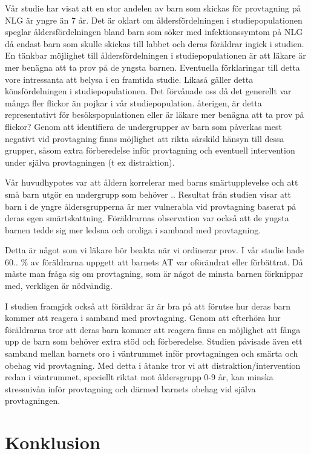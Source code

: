 \documentclass[12pt,twocolumn]{article}
\begin{document}
Vår studie har visat att en stor andelen av barn som skickas för provtagning på
NLG är yngre än 7 år. Det är oklart om åldersfördelningen i studiepopulationen
speglar åldersfördelningen bland barn som söker med infektionssymtom på NLG då
endast barn som skulle skickas till labbet och deras föräldrar ingick i studien.
En tänkbar möjlighet till åldersfördelningen i studiepopulationen är att läkare
är mer benägna att ta prov på de yngsta barnen. Eventuella förklaringar till
detta vore intressanta att belysa i en framtida studie. Likaså gäller detta
könsfördelningen i studiepopulationen. Det förvånade oss då det generellt var
många fler flickor än pojkar i vår studiepopulation. återigen, är detta
representativt för besökspopulationen eller är läkare mer benägna att ta prov på
flickor? Genom att identifiera de undergrupper av barn som påverkas mest
negativt vid provtagning finns möjlighet att rikta särskild hänsyn till dessa
grupper, såsom extra förberedelse inför provtagning och eventuell intervention
under själva provtagningen (t ex distraktion).

Vår huvudhypotes var att åldern korrelerar med barns smärtupplevelse och att små
barn utgör en undergrupp som behöver ..  Resultat från studien visar att barn i
de yngre åldersgrupperna är mer vulnerabla vid provtagning baserat på deras egen
smärtskattning. Föräldrarnas observation var också att de yngsta barnen tedde
sig mer ledsna och oroliga i samband med provtagning.

Detta är något som vi läkare bör beakta när vi ordinerar prov. I vår studie hade
60.. \% av föräldrarna uppgett att barnets AT var oförändrat eller förbättrat.
Då måste man fråga sig om provtagning, som är något de minsta barnen
förknippar med, verkligen är nödvändig.

I studien framgick också att föräldrar är är bra på att förutse hur deras barn
kommer att reagera i samband med provtagning. Genom att efterhöra hur
föräldrarna tror att deras barn kommer att  reagera finns en möjlighet att fånga
upp de barn som behöver extra stöd och förberedelse. Studien påvisade även ett
samband mellan barnets oro i väntrummet inför provtagningen och smärta och
obehag vid provtagning. Med detta i åtanke tror vi att distraktion/intervention
redan i väntrummet, speciellt riktat mot åldersgrupp 0-9 år, kan minska
stressnivån inför provtagning och därmed barnets obehag vid själva
provtagningen.

\section{Konklusion}
\end{document}
